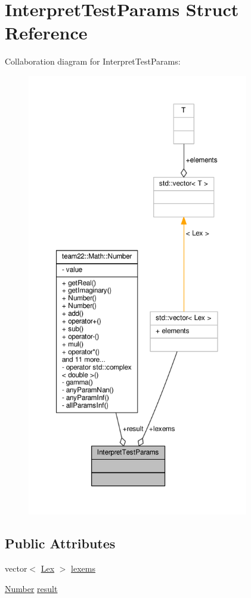 \hypertarget{struct_interpret_test_params}{}\section{Interpret\+Test\+Params Struct Reference}
\label{struct_interpret_test_params}


Collaboration diagram for Interpret\+Test\+Params\+:
\nopagebreak
\begin{figure}[H]
\begin{center}
\leavevmode
\includegraphics[height=550pt]{struct_interpret_test_params__coll__graph}
\end{center}
\end{figure}
\subsection*{Public Attributes}
\begin{DoxyCompactItemize}
\item 
vector$<$ \hyperlink{classteam22_1_1_calc_1_1_lex}{Lex} $>$ \hyperlink{struct_interpret_test_params_a3e6aa774e846f241efaa2edf7de601b6}{lexems}
\item 
\hyperlink{classteam22_1_1_math_1_1_number}{Number} \hyperlink{struct_interpret_test_params_a47453b7066c4a8ffa209157af91e7ae7}{result}
\end{DoxyCompactItemize}
